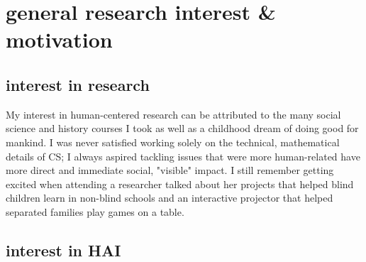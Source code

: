 
\section{general research interest \& motivation}



\subsection{interest in research}
My interest in human-centered research can be attributed to the many social science and history courses I took as well as a childhood dream of doing good for mankind. I was never satisfied working solely on the technical, mathematical details of CS; I always aspired tackling issues that were more human-related have more direct and immediate social, "visible" impact. I still remember getting excited when attending a researcher talked about her projects that helped blind children learn in non-blind schools and an interactive projector that helped separated families play games on a table.

\subsection{interest in HAI}

